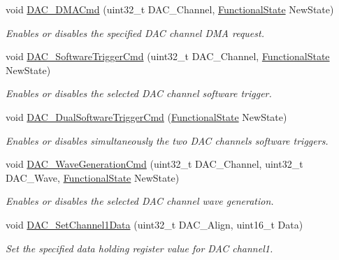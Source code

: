 \begin{DoxyCompactItemize}
void \mbox{\hyperlink{group___d_a_c___private___functions_ga194cba38f60ace11658824f0250121f4}{D\+A\+C\+\_\+\+D\+M\+A\+Cmd}} (uint32\+\_\+t D\+A\+C\+\_\+\+Channel, \mbox{\hyperlink{group___exported__types_gac9a7e9a35d2513ec15c3b537aaa4fba1}{Functional\+State}} New\+State)
\begin{DoxyCompactList}\small\item\em Enables or disables the specified D\+AC channel D\+MA request. \end{DoxyCompactList}\item 
void \mbox{\hyperlink{group___d_a_c___private___functions_ga46f9f7f6b9520a86e300fe966afe5fb3}{D\+A\+C\+\_\+\+Software\+Trigger\+Cmd}} (uint32\+\_\+t D\+A\+C\+\_\+\+Channel, \mbox{\hyperlink{group___exported__types_gac9a7e9a35d2513ec15c3b537aaa4fba1}{Functional\+State}} New\+State)
\begin{DoxyCompactList}\small\item\em Enables or disables the selected D\+AC channel software trigger. \end{DoxyCompactList}\item 
void \mbox{\hyperlink{group___d_a_c___private___functions_gab4d3b364a6b184dcd65f3b294ebf56dc}{D\+A\+C\+\_\+\+Dual\+Software\+Trigger\+Cmd}} (\mbox{\hyperlink{group___exported__types_gac9a7e9a35d2513ec15c3b537aaa4fba1}{Functional\+State}} New\+State)
\begin{DoxyCompactList}\small\item\em Enables or disables simultaneously the two D\+AC channels software triggers. \end{DoxyCompactList}\item 
void \mbox{\hyperlink{group___d_a_c___private___functions_gabd51ae6880821d4dcd923969ec19a19e}{D\+A\+C\+\_\+\+Wave\+Generation\+Cmd}} (uint32\+\_\+t D\+A\+C\+\_\+\+Channel, uint32\+\_\+t D\+A\+C\+\_\+\+Wave, \mbox{\hyperlink{group___exported__types_gac9a7e9a35d2513ec15c3b537aaa4fba1}{Functional\+State}} New\+State)
\begin{DoxyCompactList}\small\item\em Enables or disables the selected D\+AC channel wave generation. \end{DoxyCompactList}\item 
void \mbox{\hyperlink{group___d_a_c___private___functions_gad06b4230d2b17d1d13f41dce4c782461}{D\+A\+C\+\_\+\+Set\+Channel1\+Data}} (uint32\+\_\+t D\+A\+C\+\_\+\+Align, uint16\+\_\+t Data)
\begin{DoxyCompactList}\small\item\em Set the specified data holding register value for D\+AC channel1. \end{DoxyCompactList}\item 

\end{DoxyCompactItemize}
